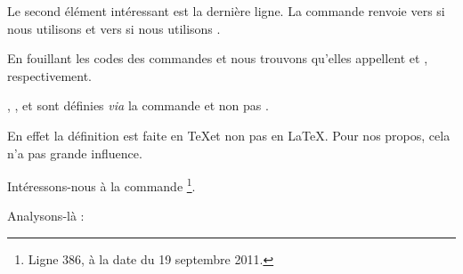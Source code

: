 Le second élément intéressant est la dernière ligne. La commande  renvoie vers  si nous utilisons  et vers  si nous utilisons .

En fouillant les codes des commandes  et  nous trouvons qu'elles appellent  et , respectivement.

\begin{plusloins}
, ,  et  sont définies \emph{via} la commande  et non pas .

En effet la définition est faite en \TeX et non pas en \LaTeX. Pour nos propos, cela n'a pas grande influence.
\end{plusloins}

Intéressons-nous à la commande \footnote{Ligne 386, à la date du 19 septembre 2011.}.

\begin{latexcode}
\def\@makechapterhead#1{%
  \vspace*{50\p@}%
  {\parindent \z@ \raggedright \normalfont
    \ifnum \c@secnumdepth >\m@ne
      \if@mainmatter
        \huge\bfseries \@chapapp\space \thechapter
        \par\nobreak
        \vskip 20\p@
      \fi
    \fi
    \interlinepenalty\@M
    \Huge \bfseries #1\par\nobreak
    \vskip 40\p@
  }}
\end{latexcode}

Analysons-là :

